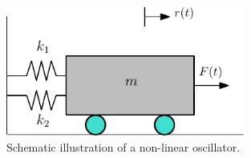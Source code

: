 \clearpage

\begin{figure}[p]
 \begin{center}
  \includegraphics[width=0.70\textwidth]{./Figures/oscillator}
\caption{Schematic illustration of a non-linear oscillator.}
\label{fig:pdfcomp_bore}
\end{center}
\end{figure}

\clearpage

